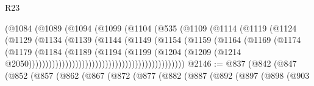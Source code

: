 \begin{lexlean}{R23}
\begin{coremodule}
                                          (@1084
                                            (@1089
                                              (@1094
                                                (@1099
                                                  (@1104
                                                    (@535
                                                      (@1109
                                                        (@1114
                                                          (@1119
                                                            (@1124
                                                              (@1129
                                                                (@1134
                                                                  (@1139
                                                                    (@1144
                                                                      (@1149
                                                                        (@1154
                                                                          (@1159
                                                                            (@1164
                                                                              (@1169
                                                                                (@1174
                                                                                  (@1179
                                                                                    (@1184
                                                                                      (@1189
                                                                                        (@1194
                                                                                          (@1199
                                                                                            (@1204
                                                                                              (@1209
                                                                                                (@1214
                                                                                                  @2050)))))))))))))))))))))))))))))))))))))))))))))))
@2146 := @837
    (@842
      (@847
        (@852
          (@857
            (@862
              (@867
                (@872
                  (@877
                    (@882
                      (@887
                        (@892
                          (@897
                            (@898
                              (@903

\end{coremodule}
\end{lexlean}
